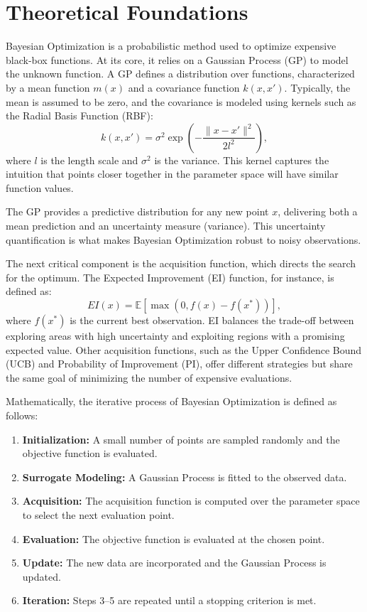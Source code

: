 \documentclass[a4paper,12pt]{article}
\begin{document}
\section{Theoretical Foundations}
Bayesian Optimization is a probabilistic method used to optimize expensive black-box functions. At its core, it relies on a Gaussian Process (GP) to model the unknown function. A GP defines a distribution over functions, characterized by a mean function \( m(x) \) and a covariance function \( k(x, x') \). Typically, the mean is assumed to be zero, and the covariance is modeled using kernels such as the Radial Basis Function (RBF):
\[
k(x, x') = \sigma^2 \exp\left(-\frac{\|x - x'\|^2}{2l^2}\right),
\]
where \( l \) is the length scale and \( \sigma^2 \) is the variance. This kernel captures the intuition that points closer together in the parameter space will have similar function values.

The GP provides a predictive distribution for any new point \( x \), delivering both a mean prediction and an uncertainty measure (variance). This uncertainty quantification is what makes Bayesian Optimization robust to noisy observations.

The next critical component is the acquisition function, which directs the search for the optimum. The Expected Improvement (EI) function, for instance, is defined as:
\[
EI(x) = \mathbb{E}\left[\max\left(0, f(x) - f(x^*)\right)\right],
\]
where \( f(x^*) \) is the current best observation. EI balances the trade-off between exploring areas with high uncertainty and exploiting regions with a promising expected value. Other acquisition functions, such as the Upper Confidence Bound (UCB) and Probability of Improvement (PI), offer different strategies but share the same goal of minimizing the number of expensive evaluations.

Mathematically, the iterative process of Bayesian Optimization is defined as follows:
\begin{enumerate}[noitemsep]
    \item \textbf{Initialization:} A small number of points are sampled randomly and the objective function is evaluated.
    \item \textbf{Surrogate Modeling:} A Gaussian Process is fitted to the observed data.
    \item \textbf{Acquisition:} The acquisition function is computed over the parameter space to select the next evaluation point.
    \item \textbf{Evaluation:} The objective function is evaluated at the chosen point.
    \item \textbf{Update:} The new data are incorporated and the Gaussian Process is updated.
    \item \textbf{Iteration:} Steps 3--5 are repeated until a stopping criterion is met.
\end{enumerate}
\end{document}
